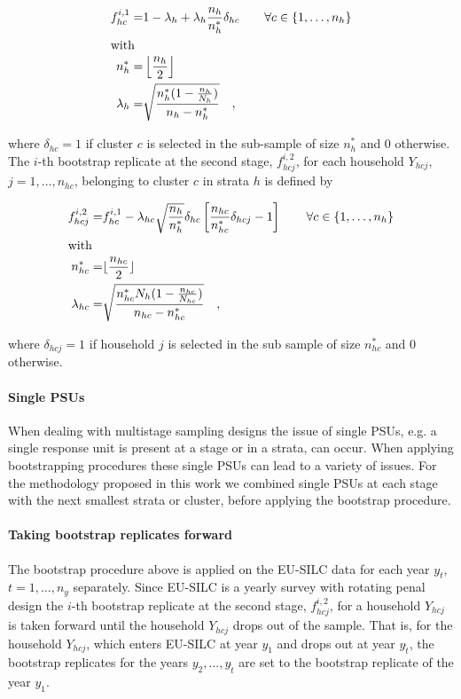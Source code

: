 \documentclass{scrartcl}\usepackage[]{graphicx}\usepackage[]{color}
\begin{document}
\begin{align*}
  f^{i,1}_{hc} =& 1-\lambda_h+\lambda_h\frac{n_h}{n_h^*}\delta_{hc} \quad\quad \forall c \in \{1,\ldots,n_h\} \\
  \intertext{with}
  n_h^* =& \left\lfloor\frac{n_h}{2}\right\rfloor \\
  \lambda_h =& \sqrt{\frac{n_h^*(1-\frac{n_h}{N_h})}{n_h-n_h^*}} \quad ,
\end{align*}

where $\delta_{hc}=1$ if cluster $c$ is selected in the sub-sample of size $n_h^*$ and 0 otherwise.\\
\noindent
The $i$-th bootstrap replicate at the second stage, $f^{i,2}_{hcj}$, for each household $Y_{hcj}$, $j=1,\ldots,n_{hc}$, belonging to cluster $c$ in strata $h$ is defined by

\begin{align*}
  f^{i,2}_{hcj} =& f^{i,1}_{hc} - \lambda_{hc}\sqrt{\frac{n_h}{n_h^*}}\delta_{hc}\left[\frac{n_{hc}}{n_{hc}^*}\delta_{hcj}-1\right] \quad\quad \forall c \in \{1,\ldots,n_h\}\\
  \intertext{with}
  n_{hc}^* =& \lfloor\frac{n_{hc}}{2}\rfloor \\
  \lambda_{hc} =& \sqrt{\frac{n_{hc}^*N_h(1-\frac{n_{hc}}{N_{hc}})}{n_{hc}-n_{hc}^*}} \quad ,
\end{align*}

where $\delta_{hcj}=1$ if household $j$ is selected in the sub sample of size $n_{hc}^*$ and 0 otherwise.\\

\paragraph{Single PSUs}
When dealing with multistage sampling designs the issue of single PSUs, e.g. a single response unit is present at a stage or in a strata, can occur. When applying bootstrapping procedures these single PSUs can lead to a variety of issues. For the methodology proposed in this work we combined single PSUs at each stage with the next smallest strata or cluster, before applying the bootstrap procedure.

\paragraph{Taking bootstrap replicates forward}
The bootstrap procedure above is applied on the EU-SILC data for each year $y_t$, $t=1,\ldots,n_y$ separately. Since EU-SILC is a yearly survey with rotating penal design the $i$-th bootstrap replicate at the second stage, $f^{i,2}_{hcj}$, for a household $Y_{hcj}$ is taken forward until the household $Y_{hcj}$ drops out of the sample. That is, for the household $Y_{hcj}$, which enters EU-SILC at year $y_1$ and drops out at year $y_{\tilde{t}}$, the bootstrap replicates for the years $y_2,\ldots,y_{\tilde{t}}$ are set to the bootstrap replicate of the year $y_1$.
\end{document}
